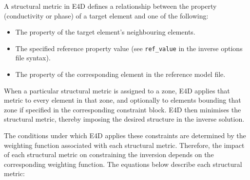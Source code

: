 \documentclass[a4paper,12pt]{article}
\begin{document}
A structural metric in E4D defines a relationship between the property (conductivity or phase) of a target element and one of the following:

\begin{itemize}
    \item The property of the target element's neighbouring elements.
    \item The specified reference property value (see \texttt{ref\_value} in the inverse options file syntax).
    \item The property of the corresponding element in the reference model file.
\end{itemize}

When a particular structural metric is assigned to a zone, E4D applies that metric to every element in that zone, and optionally to elements bounding that zone if specified in the corresponding constraint block. E4D then minimises the structural metric, thereby imposing the desired structure in the inverse solution.

The conditions under which E4D applies these constraints are determined by the weighting function associated with each structural metric. Therefore, the impact of each structural metric on constraining the inversion depends on the corresponding weighting function. The equations below describe each structural metric:
\end{document}
